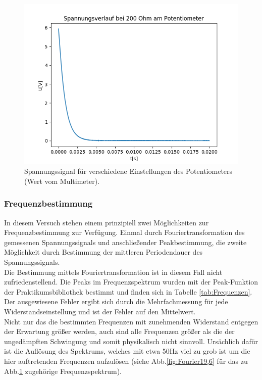 \documentclass[12pt,a4paper]{article}
\begin{document}
\begin{figure}
\begin{center}
\includegraphics[scale=0.5]{Bilder/Spannungsverlauf200}
\end{center}
\caption[Spannungsverlauf]{Spannungssignal für verschiedene Einstellungen des Potentiometers (Wert vom Multimeter).}
\label{fig:Spannung19,6}
\end{figure}



\subsubsection{Frequenzbestimmung}
In diesem Versuch stehen einem prinzipiell zwei Möglichkeiten zur Frequenzbestimmung zur Verfügung.
Einmal durch Fouriertransformation des gemessenen Spannungssignals und anschließender Peakbestimmung, die zweite Möglichkeit durch Bestimmung der mittleren Periodendauer des Spannungssignals.\\


Die Bestimmung mittels Fouriertransformation ist in diesem Fall nicht zufriedenstellend. Die Peaks im Frequenzspektrum wurden mit der Peak-Funktion der Praktikumsbibliothek bestimmt und finden sich in Tabelle \ref{tab:Frequenzen}. Der ausgewiesene Fehler ergibt sich durch die Mehrfachmessung für jede Widerstandseinstellung und ist der Fehler auf den Mittelwert.\\
Nicht nur das die bestimmten Frequenzen mit zunehmenden Widerstand entgegen der Erwartung größer werden, auch sind alle Frequenzen größer als die der ungedämpften Schwingung und somit physikalisch nicht sinnvoll.
Ursächlich dafür ist die Auflösung des Spektrums, welches mit etwa 50Hz viel zu grob ist um die hier auftretenden Frequenzen aufzulösen (siehe Abb.\ref{fig:Fourier19,6} für das zu Abb.\ref{fig:Spannung19,6} zugehörige Frequenzspektrum).\\
\end{document}
